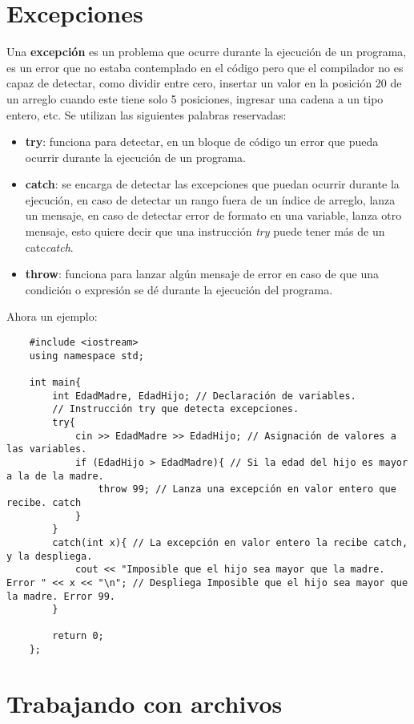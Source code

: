 \section{Excepciones}

Una \textbf{excepción} es un problema que ocurre durante la ejecución de un programa, es un error que no estaba contemplado en el código pero que el compilador no es capaz de detectar, como dividir entre cero, insertar un valor en la posición 20 de un arreglo cuando este tiene solo 5 posiciones, ingresar una cadena a un tipo entero, etc. Se utilizan las siguientes palabras reservadas:
\begin{itemize}
    \item \textbf{try}: funciona para detectar, en un bloque de código un error que pueda ocurrir durante la ejecución de un programa.
    \item \textbf{catch}: se encarga de detectar las excepciones que puedan ocurrir durante la ejecución, en caso de detectar un rango fuera de un índice de arreglo, lanza un mensaje, en caso de detectar error de formato en una variable, lanza otro mensaje, esto quiere decir que una instrucción \textit{try} puede tener más de un catc\textit{catch}.
    \item \textbf{throw}: funciona para lanzar algún mensaje de error en caso de que una condición o expresión se dé durante la ejecución del programa.
\end{itemize}

Ahora un ejemplo:
\begin{lstlisting}
    #include <iostream>
    using namespace std;
    
    int main{
        int EdadMadre, EdadHijo; // Declaración de variables.
        // Instrucción try que detecta excepciones.
        try{
            cin >> EdadMadre >> EdadHijo; // Asignación de valores a las variables.
            if (EdadHijo > EdadMadre){ // Si la edad del hijo es mayor a la de la madre.
                throw 99; // Lanza una excepción en valor entero que recibe. catch
            }
        }
        catch(int x){ // La excepción en valor entero la recibe catch, y la despliega.
            cout << "Imposible que el hijo sea mayor que la madre. Error " << x << "\n"; // Despliega Imposible que el hijo sea mayor que la madre. Error 99.
        }
        
        return 0;
    };
\end{lstlisting}



\section{Trabajando con archivos}

